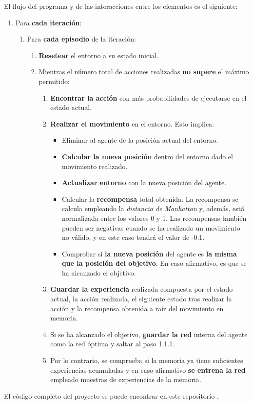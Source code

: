 El flujo del programa y de las interacciones entre los elementos es el siguiente: \\
\renewcommand{\labelenumii}{\arabic{enumi}.\arabic{enumii}.}
\renewcommand{\labelenumiii}{\arabic{enumi}.\arabic{enumii}.\arabic{enumiii}.}
\renewcommand{\labelenumiv}{\arabic{enumi}.\arabic{enumii}.\arabic{enumiii}.\arabic{enumiv}.}
\begin{enumerate}
    \item Para \textbf{cada iteración}:
    \begin{enumerate}
        \item Para \textbf{cada episodio} de la iteración: 
        \begin{enumerate}
            \item \textbf{Resetear} el entorno a su estado inicial.
            \item Mientras el número total de acciones realizadas \textbf{no supere} el máximo permitido:
            \begin{enumerate}
                \item \textbf{Encontrar la acción} con más probabilidades de ejecutarse en el estado actual. 
                \item \textbf{Realizar el movimiento} en el entorno. Esto implica: 
                \begin{itemize}
                    \item Eliminar al agente de la posición actual del entorno. 
                    \item \textbf{Calcular la nueva posición} dentro del entorno dado el movimiento realizado.
                    \item \textbf{Actualizar entorno} con la nueva posición del agente. 
                    \item Calcular la \textbf{recompensa} total obtenida. La recompensa se calcula empleando la \textit{distancia de Manhattan} y, además, está normalizada entre los valores 0 y 1. Las recompensas también pueden ser negativas cuando se ha realizado un movimiento no válido, y en este caso tendrá el valor de -0.1.
                    \item Comprobar si \textbf{la nueva posición} del agente es \textbf{la misma que la posición del objetivo}. En caso afirmativo, es que se ha alcanzado el objetivo. 
                \end{itemize}
                \item \textbf{Guardar la experiencia} realizada compuesta por el estado actual, la acción realizada, el siguiente estado tras realizar la acción y la recompensa obtenida a raíz del movimiento en memoria. 
                \item Si se ha alcanzado el objetivo, \textbf{guardar la red} interna del agente como la red óptima y saltar al paso 1.1.1.
                \item Por lo contrario, se comprueba si la memoria ya tiene suficientes experiencias acumuladas y en caso afirmativo \textbf{se entrena la red} empleado muestras de experiencias de la memoria. 
            \end{enumerate}
        \end{enumerate}
    \end{enumerate}
\end{enumerate}
El código completo del proyecto se puede encontrar en este repositorio \cite{git}.\\